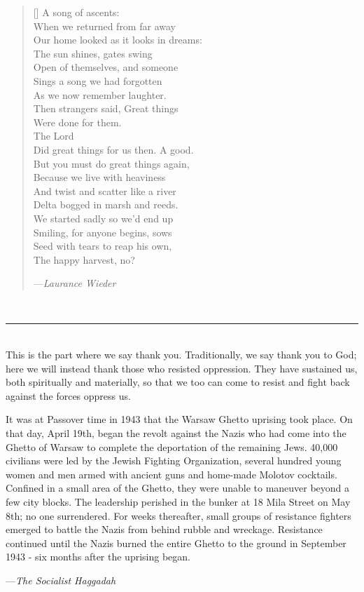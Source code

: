 \documentclass[a4paper,10pt,openany]{memoir}
\newcommand{\HgSource}[1]{\hfill{\small---\itshape{#1}}}
\newcommand{\HgFill}{\vfill \hrule \vfill}
\newenvironment{HgEnglish}{\strut\\\noindent}{\vspace{1em}}
\begin{document}
\begin{minipage}{.47\textwidth}
  \settowidth{\versewidth}{Our home looked as it looks in dreams:}
  \begin{verse}[\versewidth]
    A song of ascents: \\
    When we returned from far away \\
    Our home looked as it looks in dreams: \\
    The sun shines, gates swing \\
    Open of themselves, and someone \\
    Sings a song we had forgotten \\
    As we now remember laughter. \\
    Then strangers said, Great things \\
    Were done for them.  \\
    The Lord \\
    Did great things for us then. A good. \\
    But you must do great things again, \\
    Because we live with heaviness \\
    And twist and scatter like a river \\
    Delta bogged in marsh and reeds. \\
    We started sadly so we'd end up \\
    Smiling, for anyone begins, sows \\
    Seed with tears to reap his own, \\
    The happy harvest, no?

    \HgSource{Laurance Wieder}
  \end{verse}
\end{minipage}\\[1em]

\HgFill
\begin{HgEnglish}
  This is the part where we say thank you. Traditionally, we say thank you to
  God; here we will instead thank those who resisted oppression. They have
  sustained us, both spiritually and materially, so that we too can come to
  resist and fight back against the forces oppress us.

  It was at Passover time in 1943 that the Warsaw Ghetto uprising took place. On
  that day, April 19th, began the revolt against the Nazis who had come into the
  Ghetto of Warsaw to complete the deportation of the remaining Jews. 40,000
  civilians were led by the Jewish Fighting Organization, several hundred young
  women and men armed with ancient guns and home-made Molotov cocktails.
  Confined in a small area of the Ghetto, they were unable to maneuver beyond a
  few city blocks. The leadership perished in the bunker at 18 Mila Street on
  May 8th; no one surrendered. For weeks thereafter, small groups of resistance
  fighters emerged to battle the Nazis from behind rubble and wreckage.
  Resistance continued until the Nazis burned the entire Ghetto to the ground in
  September 1943 - six months after the uprising began.

  \HgSource{The Socialist Haggadah}
\end{HgEnglish}
\end{document}
